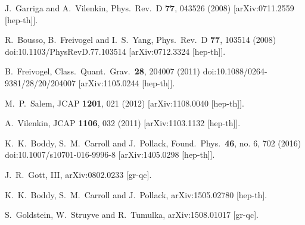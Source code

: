 \documentclass[12pt,letterpaper]{article}
\begin{document}
\begin{thebibliography}{999}
  J.~Garriga and A.~Vilenkin,
  Phys.\ Rev.\ D {\bf 77}, 043526 (2008)
  [arXiv:0711.2559 [hep-th]].

  R.~Bousso, B.~Freivogel and I.~S.~Yang,
  Phys.\ Rev.\ D {\bf 77}, 103514 (2008)
  doi:10.1103/PhysRevD.77.103514
  [arXiv:0712.3324 [hep-th]].
    
  B.~Freivogel,
  Class.\ Quant.\ Grav.\  {\bf 28}, 204007 (2011)
  doi:10.1088/0264-9381/28/20/204007
  [arXiv:1105.0244 [hep-th]].
  
  M.~P.~Salem,
  JCAP {\bf 1201}, 021 (2012)
  [arXiv:1108.0040 [hep-th]].

  A.~Vilenkin,
  JCAP {\bf 1106}, 032 (2011)
  [arXiv:1103.1132 [hep-th]].

  K.~K.~Boddy, S.~M.~Carroll and J.~Pollack,
  Found.\ Phys.\  {\bf 46}, no. 6, 702 (2016)
  doi:10.1007/s10701-016-9996-8
  [arXiv:1405.0298 [hep-th]].
  
  J.~R.~Gott, III,
  arXiv:0802.0233 [gr-qc].

  K.~K.~Boddy, S.~M.~Carroll and J.~Pollack,
  arXiv:1505.02780 [hep-th].

  S.~Goldstein, W.~Struyve and R.~Tumulka,
  arXiv:1508.01017 [gr-qc].


\end{thebibliography}
\end{document}

